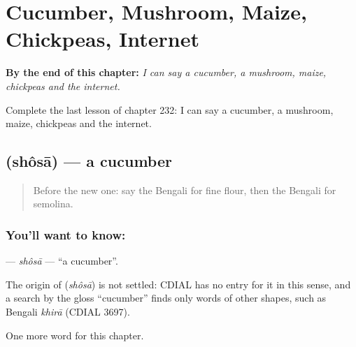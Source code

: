 
\chapter{Cucumber, Mushroom, Maize, Chickpeas, Internet}
\label{ch:bn-cucumber-mushroom-maize-chickpeas-internet}

\begin{chapteropening}
\textbf{By the end of this chapter:} \emph{I can say a cucumber, a mushroom, maize, chickpeas and the internet.}

Complete the last lesson of chapter 232: I can say a cucumber, a mushroom, maize, chickpeas and the internet.
\end{chapteropening}

\section[\texorpdfstring{\bn{শসা} (shôsā)}{শসা (shôsā)}]{ (shôsā) — a cucumber}

\label{lesson:BN-C232-shosa}



\begin{quote}
Before the new one: say the Bengali for fine flour, then the Bengali for semolina.
\end{quote}

\subsection*{You'll want to know: }
\textbf{} — \emph{shôsā} — \textquotedblleft{}a cucumber\textquotedblright{}.

\begin{cousinweb}
The origin of \textbf{} (\emph{shôsā}) is not settled: CDIAL has no entry for it in this sense, and a search by the gloss \textquotedblleft{}cucumber\textquotedblright{} finds only words of other shapes, such as Bengali \emph{khirā} (CDIAL 3697).
\end{cousinweb}

\begin{grammarlens}[title={What you've built}]
One more word for this chapter.
\end{grammarlens}

